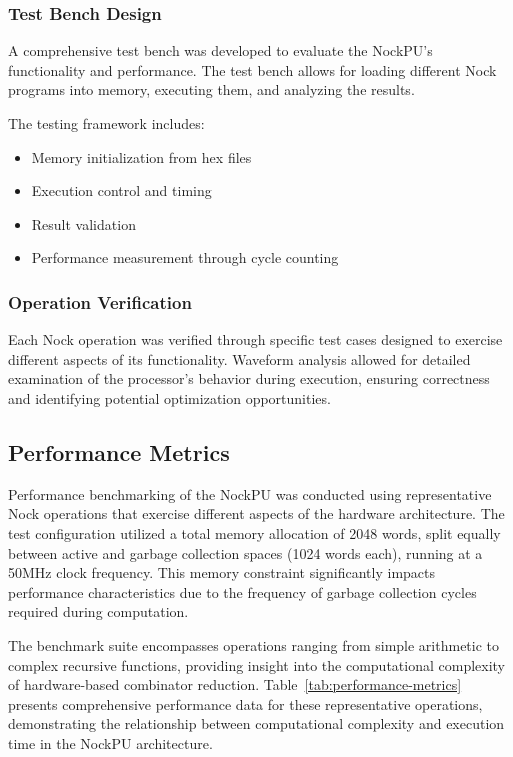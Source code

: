 \documentclass[twoside]{article}
\begin{document}
\subsubsection{Test Bench Design}

A comprehensive test bench was developed to evaluate the NockPU's functionality and performance. The test bench allows for loading different Nock programs into memory, executing them, and analyzing the results.

The testing framework includes:
\begin{itemize}
  \item Memory initialization from hex files
  \item Execution control and timing
  \item Result validation
  \item Performance measurement through cycle counting
\end{itemize}

\subsubsection{Operation Verification}

Each Nock operation was verified through specific test cases designed to exercise different aspects of its functionality. Waveform analysis allowed for detailed examination of the processor's behavior during execution, ensuring correctness and identifying potential optimization opportunities.

\subsection{Performance Metrics}

Performance benchmarking of the NockPU was conducted using representative Nock operations that exercise different aspects of the hardware architecture. The test configuration utilized a total memory allocation of 2048 words, split equally between active and garbage collection spaces (1024 words each), running at a 50MHz clock frequency. This memory constraint significantly impacts performance characteristics due to the frequency of garbage collection cycles required during computation.

The benchmark suite encompasses operations ranging from simple arithmetic to complex recursive functions, providing insight into the computational complexity of hardware-based combinator reduction. Table~\ref{tab:performance-metrics} presents comprehensive performance data for these representative operations, demonstrating the relationship between computational complexity and execution time in the NockPU architecture.
\end{document}
